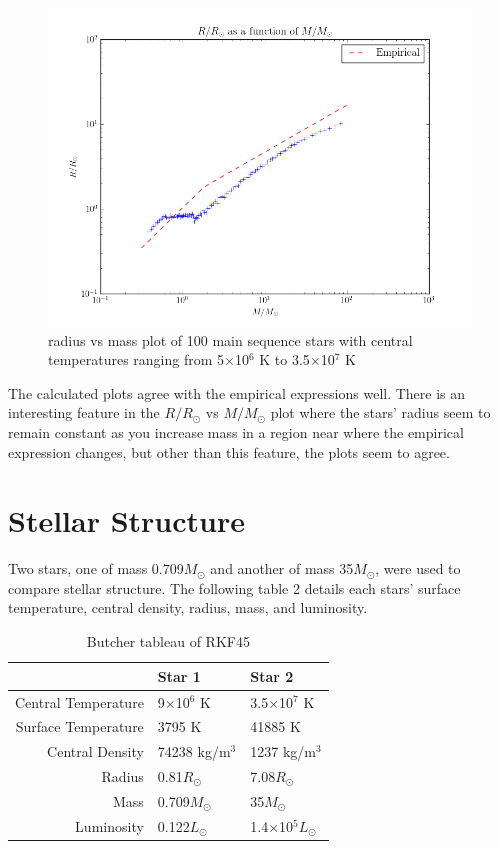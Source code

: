 \documentclass[11pt]{article}
\begin{document}
\begin{figure}[h!]
\centering
\includegraphics[scale=0.6]{plots/main_sequence/RvM.png}
\caption{radius vs mass plot of 100 main sequence stars with central temperatures ranging from 5$\times$10$^6$ K to 3.5$\times$10$^7$ K}
\label{RvM}
\end{figure}

The calculated plots agree with the empirical expressions well. There is an interesting feature in the $R/R_\odot$ vs $M/M_\odot$ plot where the stars' radius seem to remain constant as you increase mass in a region near where the empirical expression changes, but other than this feature, the plots seem to agree.\\

\newpage
\null
\newpage

\section{Stellar Structure}

Two stars, one of mass 0.709$M_\odot$ and another of mass 35$M_\odot$, were used to compare stellar structure. The following table 2 details each stars' surface temperature, central density, radius, mass, and luminosity.

\begin{table}[h!]
\begin{center}
\begin{tabular}{| r | l | l |}
\hline
 & Star 1 & Star 2 \\
\hline
Central Temperature & 9$\times$10$^6$ K & 3.5$\times$10$^7$ K \\
\hline
Surface Temperature & 3795 K & 41885 K \\
\hline
Central Density & 74238 kg/m$^3$ & 1237 kg/m$^3$ \\
\hline
Radius & 0.81$R_\odot$ & 7.08$R_\odot$ \\
\hline
Mass & 0.709$M_\odot$ & 35$M_\odot$ \\
\hline
Luminosity & 0.122$L_\odot$ & 1.4$\times$10$^5L_\odot$ \\
\hline
\end{tabular}
\caption{Butcher tableau of RKF45}
\end{center}
\end{table} 
\end{document}

